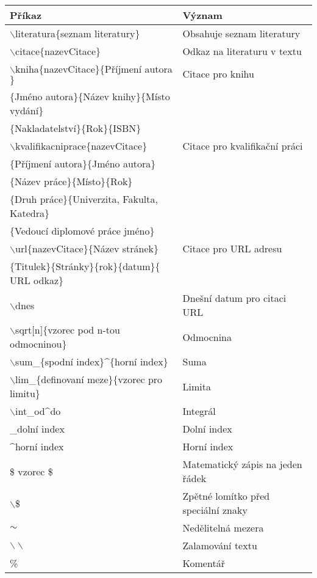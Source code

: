 \documentclass[a4paper, 12pt]{report}
\begin{document}
	\begin{table}
		\centering
		\begin{tabular}{ll}	
			\toprule[1.5pt]
			Příkaz & Význam\\
			\midrule
			$\backslash$literatura$\{$seznam literatury$\}$ & Obsahuje seznam literatury\\
			$\backslash$citace$\{$nazevCitace$\}$ & Odkaz na literaturu v textu\\
			$\backslash$kniha$\{$nazevCitace$\}\{$Příjmení autora$\}$ & Citace pro knihu\\
			$\{$Jméno autora$\}\{$Název knihy$\}\{$Místo vydání$\}$\\
			$\{$Nakladatelství$\}\{$Rok$\}\{$ISBN$\}$\\
			$\backslash$kvalifikacniprace$\{$nazevCitace$\}$ & Citace pro kvalifikační práci\\
			$\{$Příjmení autora$\}\{$Jméno autora$\}$\\
			$\{$Název práce$\}\{$Místo$\}\{$Rok$\}$\\
			$\{$Druh práce$\}\{$Univerzita, Fakulta, Katedra$\}$\\
			$\{$Vedoucí diplomové práce jméno$\}$\\
			$\backslash$url$\{$nazevCitace$\}\{$Název stránek$\}$ & Citace pro URL adresu\\
			$\{$Titulek$\}\{$Stránky$\}\{$rok$\}\{$datum$\}\{$URL odkaz$\}$\\
			$\backslash$dnes & Dnešní datum pro citaci URL\\
			$\backslash$sqrt$[$n$]\{$vzorec pod n-tou odmocninou$\}$ & Odmocnina\\
			$\backslash$sum\_$\{$spodní index$\}$\textasciicircum $\{$horní index$\}$ & Suma\\	
			$\backslash$lim\_$\{$definovaní meze$\}\{$vzorec pro limitu$\}$ & Limita\\
			$\backslash$int\_od\textasciicircum do & Integrál\\
			\_{dolní index} & Dolní index\\
			\textasciicircum{horní index} & Horní index\\
			\$ vzorec \$  & Matematický zápis na jeden řádek\\
			$\backslash$\$ & Zpětné lomítko před speciální znaky\\
			$\sim$ & Nedělitelná mezera\\
			$\backslash \backslash$ & Zalamování textu\\
			\% & Komentář\\
			\bottomrule[1,5pt]
		\end{tabular}
	\end{table}
	
\end{document}
